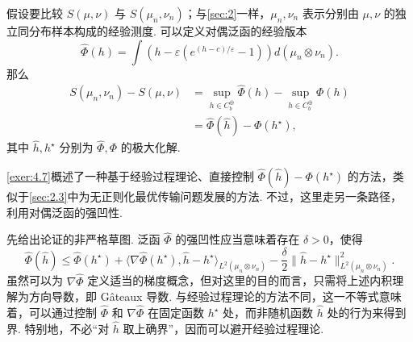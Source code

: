 假设要比较 $S(\mu,\nu)$ 与 $S(\mu_n,\nu_n)$；与\autoref{sec:2}一样，$\mu_n,\nu_n$ 表示分别由 $\mu,\nu$ 的独立同分布样本构成的经验测度. 可以定义对偶泛函的经验版本
$$\widehat\Phi(h)=\int\left(h-\varepsilon(e^{(h-c)/\varepsilon}-1)\right)d(\mu_n\otimes\nu_n).$$
那么
$$\begin{aligned}
S(\mu_n,\nu_n)-S(\mu,\nu)
&=\sup_{h\in C_b^\oplus}\widehat\Phi(h)-\sup_{h\in C_b^\oplus}\Phi(h)\\
&=\widehat\Phi(\widehat h)-\Phi(h^\star),
\end{aligned}$$
其中 $\widehat h,h^\star$ 分别为 $\widehat\Phi,\Phi$ 的极大化解.

\autoref{exer:4.7}概述了一种基于经验过程理论、直接控制 $\widehat\Phi(\widehat h)-\Phi(h^\star)$ 的方法，类似于\autoref{sec:2.3}中为无正则化最优传输问题发展的方法. 不过，这里走另一条路径，利用对偶泛函的强凹性.

先给出论证的非严格草图. 泛函 $\widehat\Phi$ 的强凹性应当意味着存在 $\delta>0$，使得
$$\widehat\Phi(\widehat h)\le\widehat\Phi(h^\star)
+\langle\nabla\widehat\Phi(h^\star),\widehat h-h^\star\rangle_{L^2(\mu_n\otimes\nu_n)}
-\frac\delta2\|\widehat h-h^\star\|_{L^2(\mu_n\otimes\nu_n)}^2.$$
虽然可以为 $\nabla\widehat\Phi$ 定义适当的梯度概念，但对这里的目的而言，只需将上述内积理解为方向导数，即 G\^ateaux 导数. 与经验过程理论的方法不同，这一不等式意味着，可以通过控制 $\widehat\Phi$ 和 $\nabla\widehat\Phi$ 在固定函数 $h^\star$ 处，而非随机函数 $\widehat h$ 处的行为来得到界. 特别地，不必“对 $\widehat h$ 取上确界”，因而可以避开经验过程理论.

